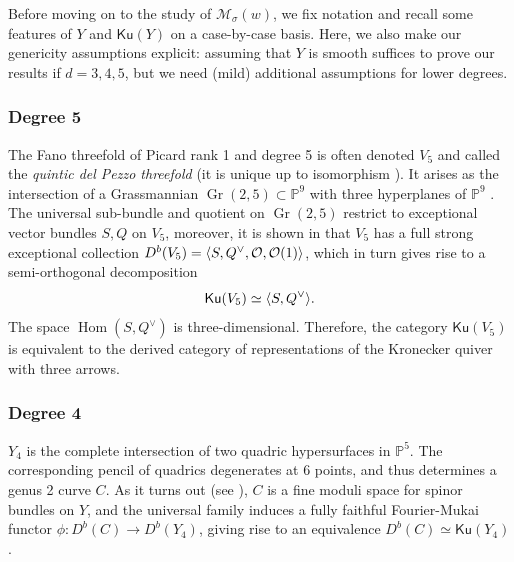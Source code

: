 \documentclass[11pt]{amsart}
\theoremstyle{definition}
\newcommand{\pr}[1]{\mathbb P^{#1}}
\DeclareMathOperator{\Hom}{Hom}
\DeclareMathOperator{\Gr}{Gr}
\newcommand{\sO}{\mathcal{O}}
\newcommand{\sM}{\mathcal{M}}
\newcommand{\AAA}[1]{\textcolor{red}{#1}}
\DeclarePairedDelimiter{\pair}{\langle}{\rangle}
\newcommand{\Ku}{\mathsf{Ku}}
\begin{document}
Before moving on to the study of $\sM_\sigma(w)$, we fix notation and recall some features of $Y$ and $\Ku(Y)$ on a case-by-case basis. Here, we also make our genericity assumptions explicit: assuming that $Y$ is smooth suffices to prove our results if $d=3,4,5$, but we need (mild) additional assumptions for lower degrees.%


\subsubsection*{Degree 5}
The Fano threefold of Picard rank 1 and degree 5 is often denoted $V_5$ and called the \textit{quintic del Pezzo threefold} (it is unique up to isomorphism \cite{Isk77}). It arises as the intersection of a Grassmannian $\Gr(2,5)\subset \pr 9$ with three hyperplanes of $\pr 9$ \cite[Proposition~10]{Muk92}. The universal sub-bundle and quotient on $\Gr(2,5)$ restrict to exceptional vector bundles $S,Q$ on $V_5$, moreover, it is shown in \cite{Or91} that $V_5$ has a full strong exceptional collection
$D^b(V_5)=\pair{S,Q^\vee,\sO,\sO(1)}$,
which in turn gives rise to a semi-orthogonal decomposition 
\[ \Ku(V_5)\simeq \pair{S,Q^\vee}. \]
The space $\Hom(S,Q^\vee)$ is three-dimensional. Therefore, the category $\Ku(V_5)$ is equivalent to the derived category of representations of the Kronecker quiver with three arrows. 

\subsubsection*{Degree 4}
$Y_4$ is the complete intersection of two quadric hypersurfaces in $\pr 5$. The corresponding pencil of quadrics degenerates at 6 points, and thus determines a genus 2 curve $C$. 
As it turns out (see \cite[Theorem~2.9]{BO95}), $C$ is a fine moduli space for spinor bundles on $Y$, 
and the universal family induces a fully faithful Fourier-Mukai functor $\phi\colon D^b(C) \to D^b(Y_4)$,
giving rise to an equivalence $D^b(C)\simeq \Ku(Y_4)$.

\end{document}
